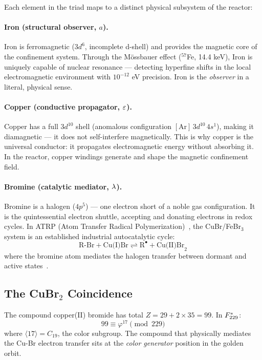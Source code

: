 Each element in the triad maps to a distinct physical subsystem of the reactor:

\paragraph{Iron (structural observer, $a$).}
Iron is ferromagnetic ($3d^6$, incomplete d-shell) and provides the magnetic core of the confinement system. Through the Mössbauer effect ($^{57}$Fe, 14.4 keV), Iron is uniquely capable of nuclear resonance — detecting hyperfine shifts in the local electromagnetic environment with $10^{-12}$ eV precision. Iron is the \emph{observer} in a literal, physical sense.

\paragraph{Copper (conductive propagator, $\varepsilon$).}
Copper has a full $3d^{10}$ shell (anomalous configuration $[\text{Ar}]\,3d^{10}\,4s^1$), making it diamagnetic — it does not self-interfere magnetically. This is why copper is the universal conductor: it propagates electromagnetic energy without absorbing it. In the reactor, copper windings generate and shape the magnetic confinement field.

\paragraph{Bromine (catalytic mediator, $\lambda$).}
Bromine is a halogen ($4p^5$) — one electron short of a noble gas configuration. It is the quintessential electron shuttle, accepting and donating electrons in redox cycles. In ATRP (Atom Transfer Radical Polymerization)~\cite{Matyjaszewski1995ATRP}, the CuBr/FeBr$_3$ system is an established industrial autocatalytic cycle:
\[ \text{R-Br} + \text{Cu(I)Br} \rightleftharpoons \text{R}^\bullet + \text{Cu(II)Br}_2 \]
where the bromine atom mediates the halogen transfer between dormant and active states~\cite{WangMatyjaszewski2006}.

\subsection{The CuBr$_2$ Coincidence}

The compound copper(II) bromide has total $Z = 29 + 2 \times 35 = 99$. In $F_{229}^*$:
\[ 99 \equiv \varphi^{17} \pmod{229} \]
where $\langle 17 \rangle = C_{19}$, the color subgroup. The compound that physically mediates the Cu-Br electron transfer sits at the \emph{color generator} position in the golden orbit.

